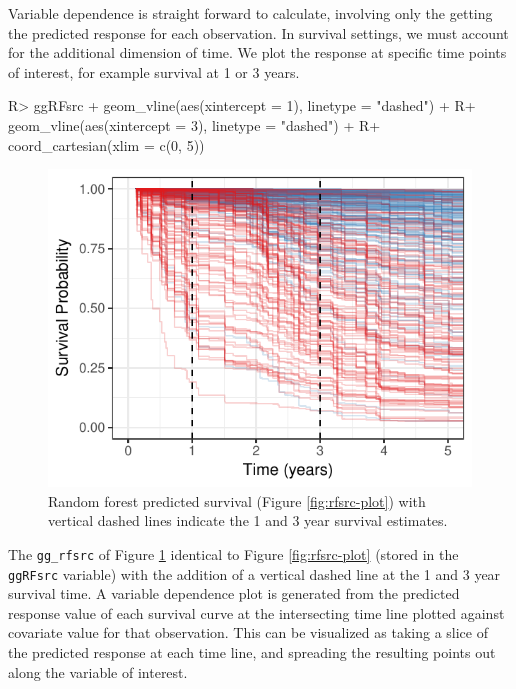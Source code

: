 \documentclass[article]{jss}
\begin{document}
Variable dependence is straight forward to calculate, involving only the
getting the predicted response for each observation. In survival
settings, we must account for the additional dimension of time. We plot
the response at specific time points of interest, for example survival
at 1 or 3 years.

\begin{Schunk}
\begin{Sinput}
R> ggRFsrc + geom_vline(aes(xintercept = 1), linetype = "dashed") +
R+    geom_vline(aes(xintercept = 3), linetype = "dashed") +
R+   coord_cartesian(xlim = c(0, 5))
\end{Sinput}
\begin{figure}[!htb]

{\centering \includegraphics{fig-rfs/rfs-rfsrc-plot3Mnth-1} 

}

\caption{Random forest predicted survival (Figure \ref{fig:rfsrc-plot}) with vertical dashed lines indicate the 1 and 3 year survival estimates.}\label{fig:rfsrc-plot3Mnth}
\end{figure}
\end{Schunk}

The \texttt{gg\_rfsrc} of Figure \ref{fig:rfsrc-plot3Mnth} identical to
Figure \ref{fig:rfsrc-plot} (stored in the \texttt{ggRFsrc} variable)
with the addition of a vertical dashed line at the 1 and 3 year survival
time. A variable dependence plot is generated from the predicted
response value of each survival curve at the intersecting time line
plotted against covariate value for that observation. This can be
visualized as taking a slice of the predicted response at each time
line, and spreading the resulting points out along the variable of
interest.
\end{document}
